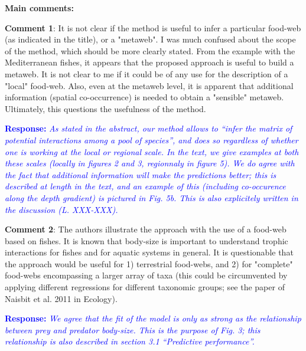 \documentclass [12pt,onecolumn,twoside,openright]{report}
\begin{document}
\begin{onehalfspacing}
\medskip \textbf{\large{Main comments:}}

\medskip \textbf{Comment 1}: It is not clear if the method is
useful to infer a particular food-web (as indicated in the title), or a
"metaweb". I was much confused about the scope of the method, which should be
more clearly stated. From the example with the Mediterranean fishes, it appears
that the proposed approach is useful to build a metaweb. It is not clear to me
if it could be of any use for the description of a "local" food-web. Also, even
at the metaweb level, it is apparent that additional information (spatial
co-occurrence) is needed to obtain a "sensible" metaweb. Ultimately, this
questions the usefulness of the method.

\medskip \textcolor{blue}{\textbf{Response:}} \textit{\textcolor{blue}{As stated
in the abstract, our method allows to ``infer the matrix of potential
interactions among a pool of species'', and does so regardless of whether one is
working at the local or regional scale. In the text, we give examples at both
these scales (locally in figures 2 and 3, regionnaly in figure 5). We do agree
with the fact that additional information will make the predictions better; this
is described at length in the text, and an example of this (including
co-occurence along the depth gradient) is pictured in Fig. 5b. This is also
explicitely written in the discussion (L. XXX-XXX).}}

\medskip \textbf{Comment 2}: The authors illustrate the
approach with the use of a food-web based on fishes. It is known that body-size
is important to understand trophic interactions for fishes and for aquatic
systems in general. It is questionable that the approach would be useful for 1)
terrestrial food-webs, and 2) for "complete" food-webs encompassing a larger
array of taxa (this could be circumvented by applying different regressions for
different taxonomic groups; see the paper of Naisbit et al. 2011 in Ecology).

\medskip \textcolor{blue}{\textbf{Response:}} \textit{\textcolor{blue}{We agree
that the fit of the model is only as strong as the relationship between prey and
predator body-size. This is the purpose of Fig. 3; this relationship is also
described in section 3.1 ``Predictive performance''.}}


\end{onehalfspacing}
\end{document}
